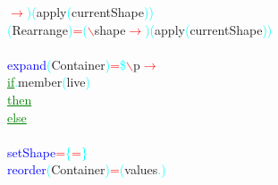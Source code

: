 \textcolor{red}{\ensuremath{\rightarrow}}\hsspace {}\hsspace \hsspace \hsspace \hsspace {}\textcolor{cyan}{)}\hsspace \textcolor{cyan}{(}{\rm{}apply}\hsspace \textcolor{cyan}{(}{\rm{}currentShape}\hsspace \hsspace \hsspace {}\hsspace \hsspace \textcolor{cyan}{)}\textcolor{cyan}{)}\\\hsspace \textcolor{cyan}{(}{\rm{}Rearrange}\textcolor{cyan}{)}\hsspace \textcolor{red}{=}\hsspace \textcolor{cyan}{(}\textcolor{red}{$\backslash$}{\rm{}shape}\hsspace \textcolor{red}{\ensuremath{\rightarrow}}\hsspace \hsspace \hsspace \hsspace {}\textcolor{cyan}{)}\hsspace \textcolor{cyan}{(}{\rm{}apply}\hsspace \textcolor{cyan}{(}{\rm{}currentShape}\hsspace \hsspace \hsspace {}\hsspace \hsspace \textcolor{cyan}{)}\textcolor{cyan}{)}\\\\\textcolor{blue}{expand}\hsspace \textcolor{cyan}{(}{\rm{}Container}\textcolor{cyan}{)}\hsspace \textcolor{red}{=}\hsspace \textcolor{cyan}{\$}\hsspace \textcolor{red}{$\backslash$}{\rm{}p}\hsspace \textcolor{red}{\ensuremath{\rightarrow}}\\\hstab \textcolor{green}{\underline{if}}\textcolor{cyan}{.}{\rm{}member}\hsspace \textcolor{cyan}{(}{\rm{}live}\textcolor{cyan}{)}\\\hstab \textcolor{green}{\underline{then}}\\\hstab \textcolor{green}{\underline{else}}\\\\\textcolor{blue}{setShape}\hsspace \textcolor{red}{=}\hsspace \textcolor{cyan}{\{}\hsspace \textcolor{red}{=}\hsspace \textcolor{cyan}{\}}\\\textcolor{blue}{reorder}\hsspace \textcolor{cyan}{(}{\rm{}Container}\textcolor{cyan}{)}\hsspace \textcolor{red}{=}\hsspace \textcolor{cyan}{(}{\rm{}values}\hsspace \textcolor{cyan}{.}\textcolor{cyan}{)}\\
